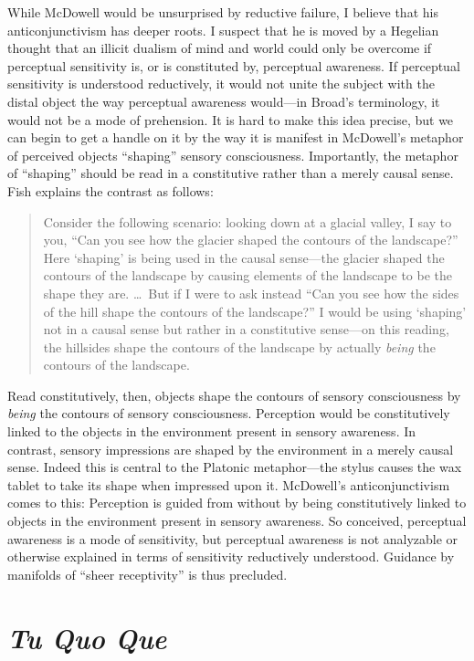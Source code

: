 \documentclass[12pt]{article}
\begin{document}
While McDowell would be unsurprised by reductive failure, I believe that his anticonjunctivism has deeper roots. I suspect that he is moved by a Hegelian thought that an illicit dualism of mind and world could only be overcome if perceptual sensitivity is, or is constituted by, perceptual awareness. If perceptual sensitivity is understood reductively, it would not unite the subject with the distal object the way perceptual awareness would---in Broad's terminology, it would not be a mode of prehension. It is hard to make this idea precise, but we can begin to get a handle on it by the way it is manifest in McDowell's metaphor of perceived objects ``shaping'' sensory consciousness. Importantly, the metaphor of ``shaping'' should be read in a constitutive rather than a merely causal sense. Fish explains the contrast as follows:
\begin{quote}
	Consider the following scenario: looking down at a glacial valley, I say to you, ``Can you see how the glacier shaped the contours of the landscape?'' Here `shaping' is being used in the causal sense---the glacier shaped the contours of the landscape by causing elements of the landscape to be the shape they are. \ldots\ But if I were to ask instead ``Can you see how the sides of the hill shape the contours of the landscape?'' I would be using `shaping' not in a causal sense but rather in a constitutive sense---on this reading, the hillsides shape the contours of the landscape by actually \emph{being} the contours of the landscape. \citep[6]{Fish:2009fk}
\end{quote}
Read constitutively, then, objects shape the contours of sensory consciousness by \emph{being} the contours of sensory consciousness. Perception would be constitutively linked to the objects in the environment present in sensory awareness. In contrast, sensory impressions are shaped by the environment in a merely causal sense. Indeed this is central to the Platonic metaphor---the stylus causes the wax tablet to take its shape when impressed upon it. McDowell's anticonjunctivism comes to this: Perception is guided from without by being constitutively linked to objects in the environment present in sensory awareness. So conceived, perceptual awareness is a mode of sensitivity, but perceptual awareness is not analyzable or otherwise explained in terms of sensitivity reductively understood. Guidance by manifolds of ``sheer receptivity'' is thus precluded.


\section{\emph{Tu Quo Que}} %
\label{sec:tu_quo_que}
\end{document}
